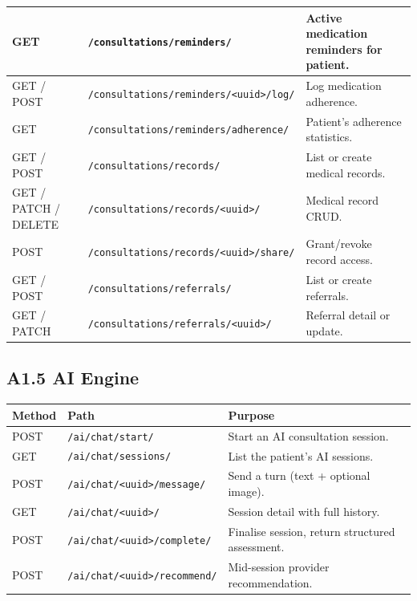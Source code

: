 \begin{longtable}{|p{1.4cm}|p{6.5cm}|p{6.0cm}|}
GET   & \texttt{/consultations/reminders/}                             & Active medication reminders for patient. \\ \hline
GET / POST & \texttt{/consultations/reminders/<uuid>/log/}             & Log medication adherence. \\ \hline
GET   & \texttt{/consultations/reminders/adherence/}                   & Patient's adherence statistics. \\ \hline
GET / POST & \texttt{/consultations/records/}                          & List or create medical records. \\ \hline
GET / PATCH / DELETE & \texttt{/consultations/records/<uuid>/}         & Medical record CRUD. \\ \hline
POST  & \texttt{/consultations/records/<uuid>/share/}                  & Grant/revoke record access. \\ \hline
GET / POST & \texttt{/consultations/referrals/}                        & List or create referrals. \\ \hline
GET / PATCH & \texttt{/consultations/referrals/<uuid>/}                & Referral detail or update. \\ \hline

\end{longtable}

\subsection*{A1.5 AI Engine}

\begin{longtable}{|p{1.4cm}|p{6.5cm}|p{6.0cm}|}
\hline
\textbf{Method} & \textbf{Path} & \textbf{Purpose} \\ \hline

\endhead
POST & \texttt{/ai/chat/start/}                  & Start an AI consultation session. \\ \hline
GET  & \texttt{/ai/chat/sessions/}               & List the patient's AI sessions. \\ \hline
POST & \texttt{/ai/chat/<uuid>/message/}         & Send a turn (text + optional image). \\ \hline
GET  & \texttt{/ai/chat/<uuid>/}                 & Session detail with full history. \\ \hline
POST & \texttt{/ai/chat/<uuid>/complete/}        & Finalise session, return structured assessment. \\ \hline
POST & \texttt{/ai/chat/<uuid>/recommend/}       & Mid-session provider recommendation. \\ \hline

\end{longtable}

